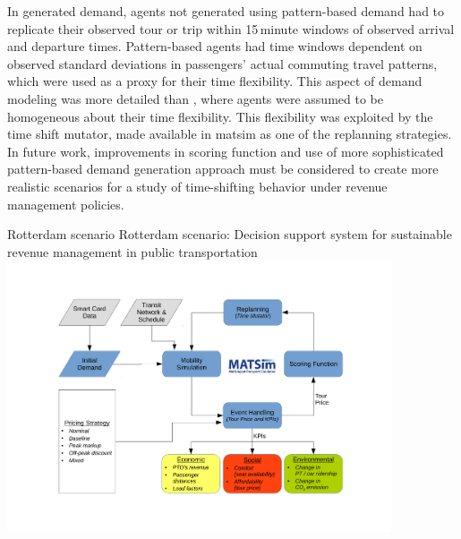 In generated demand, agents not generated using pattern-based demand had to replicate their observed tour or trip within 15\,minute windows of observed arrival and departure times. Pattern-based agents had time windows dependent on observed standard deviations in passengers' actual commuting travel patterns, which were used as a proxy for their time flexibility. This aspect of demand modeling was more detailed than \citet[][]{LovricEtAl_DSS_2013}, where agents were assumed to be homogeneous about their time flexibility. This flexibility was exploited by the time shift mutator, made available in \gls{matsim} as one of the \gls{replanning} strategies. In future work, improvements in scoring function and use of more sophisticated pattern-based demand generation approach must be considered to create more realistic scenarios for a study of time-shifting behavior under revenue management policies.

\createfigure%
{Rotterdam scenario}%
{Rotterdam scenario: Decision support system for sustainable revenue management in public transportation}%
{\label{fig:rotterdam}}%
{\includegraphics[width=0.85\textwidth, angle=0]{./scenarios/figures/rotterdam}}%
{}


